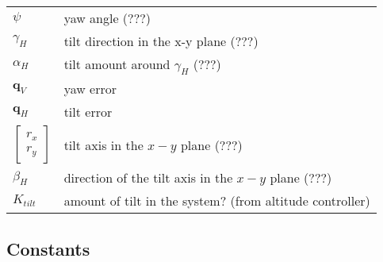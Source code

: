 \documentclass{article}
\numberwithin{equation}{section} %
\newcommand{\bs}[1]{\boldsymbol{#1}}
\begin{document}
\begin{tabular}{l l}
 	$ \psi $				& yaw angle ($???$) \\
 	$ \gamma_H $			& tilt direction in the x-y plane ($???$) \\
 	$ \alpha_H $			& tilt amount around $\gamma_H$ ($???$) \\
 	$ \bs{q}_V$				& yaw error \\
 	$ \bs{q}_H$				& tilt error \\
 	$ \begin{bmatrix}
 		r_x \\
 		r_y \end{bmatrix}$	& tilt axis in the $x-y$ plane ($???$) \\
 	$ \beta_H $				& direction of the tilt axis in the $x-y$ plane ($???$) \\
	$ K_{tilt} $			& amount of tilt in the system? (from altitude controller) \\
	 	
 	
 	

 	
\end{tabular}

\subsection{Constants}
\end{document}
